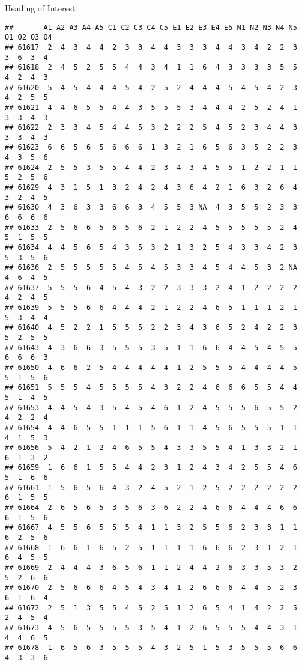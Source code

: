 \documentclass[
  ignorenonframetext,
]{beamer}
\begin{document}
\begin{frame}[fragile]{Heading of Interest}
\begin{verbatim}
##       A1 A2 A3 A4 A5 C1 C2 C3 C4 C5 E1 E2 E3 E4 E5 N1 N2 N3 N4 N5 O1 O2 O3 O4
## 61617  2  4  3  4  4  2  3  3  4  4  3  3  3  4  4  3  4  2  2  3  3  6  3  4
## 61618  2  4  5  2  5  5  4  4  3  4  1  1  6  4  3  3  3  3  5  5  4  2  4  3
## 61620  5  4  5  4  4  4  5  4  2  5  2  4  4  4  5  4  5  4  2  3  4  2  5  5
## 61621  4  4  6  5  5  4  4  3  5  5  5  3  4  4  4  2  5  2  4  1  3  3  4  3
## 61622  2  3  3  4  5  4  4  5  3  2  2  2  5  4  5  2  3  4  4  3  3  3  4  3
## 61623  6  6  5  6  5  6  6  6  1  3  2  1  6  5  6  3  5  2  2  3  4  3  5  6
## 61624  2  5  5  3  5  5  4  4  2  3  4  3  4  5  5  1  2  2  1  1  5  2  5  6
## 61629  4  3  1  5  1  3  2  4  2  4  3  6  4  2  1  6  3  2  6  4  3  2  4  5
## 61630  4  3  6  3  3  6  6  3  4  5  5  3 NA  4  3  5  5  2  3  3  6  6  6  6
## 61633  2  5  6  6  5  6  5  6  2  1  2  2  4  5  5  5  5  5  2  4  5  1  5  5
## 61634  4  4  5  6  5  4  3  5  3  2  1  3  2  5  4  3  3  4  2  3  5  3  5  6
## 61636  2  5  5  5  5  5  4  5  4  5  3  3  4  5  4  4  5  3  2 NA  4  6  4  5
## 61637  5  5  5  6  4  5  4  3  2  2  3  3  3  2  4  1  2  2  2  2  4  2  4  5
## 61639  5  5  5  6  6  4  4  4  2  1  2  2  4  6  5  1  1  1  2  1  5  3  4  4
## 61640  4  5  2  2  1  5  5  5  2  2  3  4  3  6  5  2  4  2  2  3  5  2  5  5
## 61643  4  3  6  6  3  5  5  5  3  5  1  1  6  6  4  4  5  4  5  5  6  6  6  3
## 61650  4  6  6  2  5  4  4  4  4  4  1  2  5  5  5  4  4  4  4  5  5  1  5  6
## 61651  5  5  5  4  5  5  5  5  4  3  2  2  4  6  6  6  5  5  4  4  5  1  4  5
## 61653  4  4  5  4  3  5  4  5  4  6  1  2  4  5  5  5  6  5  5  2  4  2  2  4
## 61654  4  4  6  5  5  1  1  1  5  6  1  1  4  5  6  5  5  5  1  1  4  1  5  3
## 61656  5  4  2  1  2  4  6  5  5  4  3  3  5  5  4  1  3  3  2  1  6  1  3  2
## 61659  1  6  6  1  5  5  4  4  2  3  1  2  4  3  4  2  5  5  4  6  5  1  6  6
## 61661  1  5  6  5  6  4  3  2  4  5  2  1  2  5  2  2  2  2  2  2  6  1  5  5
## 61664  2  6  5  6  5  3  5  6  3  6  2  2  4  6  6  4  4  4  6  6  6  1  5  6
## 61667  4  5  5  6  5  5  5  4  1  1  3  2  5  5  6  2  3  3  1  1  6  2  5  6
## 61668  1  6  6  1  6  5  2  5  1  1  1  1  6  6  6  2  3  1  2  1  6  4  5  5
## 61669  2  4  4  4  3  6  5  6  1  1  2  4  4  2  6  3  3  5  3  2  5  2  6  6
## 61670  2  5  6  6  6  4  5  4  3  4  1  2  6  6  6  4  4  5  2  3  6  1  6  4
## 61672  2  5  1  3  5  5  4  5  2  5  1  2  6  5  4  1  4  2  2  5  2  4  5  4
## 61673  4  5  6  5  5  5  5  3  5  4  1  2  6  5  5  5  4  4  3  1  4  4  6  5
## 61678  1  6  5  6  3  5  5  5  4  3  2  5  1  5  3  5  5  5  6  6  4  3  3  6

\end{verbatim}
\end{frame}
\end{document}
